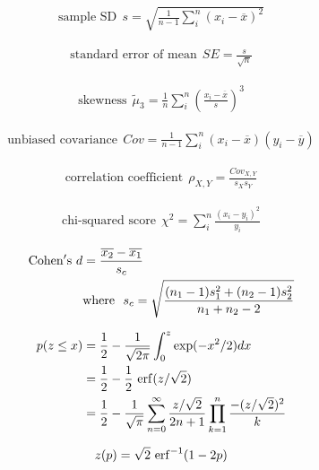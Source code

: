 \begin{align*} 
    \text{sample SD}~~s = \sqrt{\frac{1}{n-1}\sum_i^{n}(x_i-\overline{x})^2}
\end{align*}

\begin{align*} 
    \text{standard error of mean}~~SE = \frac{s}{\sqrt{n}}
\end{align*}

\begin{align*} 
    \text{skewness}~~\tilde{\mu}_3 = \frac{1}{n}\sum_i^{n}\left(\frac{x_i-\overline{x}}{s}\right)^3
\end{align*}

\begin{align*} 
    \text{unbiased covariance}~~Cov = \frac{1}{n-1}\sum_i^{n}(x_i-\overline{x})(y_i-\overline{y})
\end{align*}

\begin{align*} 
    \text{correlation coefficient}~~\rho_{X,Y} = \frac{Cov_{X,Y}}{s_{X}s_{Y}}
\end{align*}

\begin{align*} 
    \text{chi-squared score}~~\chi^2 = \sum_i^{n}\frac{(x_i-y_i)^2}{y_i}
\end{align*}

\begin{align*}
    {\rm Cohen's}~d &= \frac{\overline{x_2}-\overline{x_1}}{s_c} \\
    &\text{where}~~s_c = \sqrt{\frac{(n_1-1)s_1^2+(n_2-1)s_2^2}{n_1+n_2-2}}
\end{align*}


\begin{align*} 
    p(z \leq x) &= \frac{1}{2} - \frac{1}{\sqrt{2\pi}}\int_{0}^{z}\exp(-x^2/2)dx \\
    &= \frac{1}{2}-\frac{1}{2}~{\rm erf}(z/\sqrt{2}) \\
    &= \frac{1}{2}-\frac{1}{\sqrt{\pi}}\sum_{n=0}^{\infty}\frac{z/\sqrt{2}}{2n+1}\prod_{k=1}^{n}\frac{-(z/\sqrt{2})^2}{k}
\end{align*}

\begin{align*} 
    z(p) = \sqrt{2}~{\rm erf}^{-1}(1-2p)
\end{align*}

